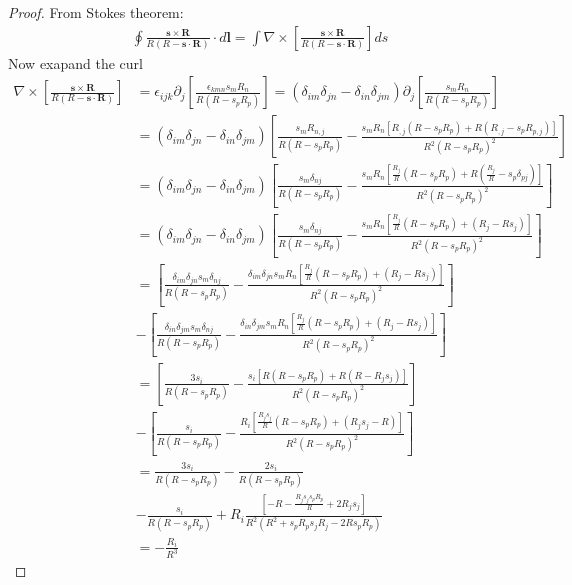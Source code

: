\begin{proof}
From Stokes theorem:
\begin{align}
\oint\frac{\bm s\times\bm R}{R(R-\bm s\cdot\bm R)}\cdot d\bm l=\int\nabla\times\left[\frac{\bm s\times\bm R}{R(R-\bm s\cdot\bm R)}\right]ds
\end{align}
Now exapand the curl
\begin{align}
\nabla\times\left[\frac{\bm s\times\bm R}{R(R-\bm s\cdot\bm R)}\right]&=\epsilon_{ijk}\partial_j\left[\frac{\epsilon_{kmn}s_mR_n}{R(R-s_pR_p)}\right]=\left(\delta_{im}\delta_{jn}-\delta_{in}\delta_{jm}\right)\partial_j\left[\frac{s_mR_n}{R(R-s_pR_p)}\right]\nonumber\\
&=\left(\delta_{im}\delta_{jn}-\delta_{in}\delta_{jm}\right)\left[\frac{s_mR_{n,j}}{R(R-s_pR_p)}-\frac{s_mR_{n}\left[R_{,j}(R-s_pR_p)+R(R_{,j}-s_pR_{p,j})\right]}{R^2(R-s_pR_p)^2}\right]\nonumber\\
&=\left(\delta_{im}\delta_{jn}-\delta_{in}\delta_{jm}\right)\left[\frac{s_m\delta_{nj}}{R(R-s_pR_p)}-\frac{s_mR_{n}\left[\frac{R_j}{R}(R-s_pR_p)+R(\frac{R_j}{R}-s_p\delta_{pj})\right]}{R^2(R-s_pR_p)^2}\right]\nonumber\\
&=\left(\delta_{im}\delta_{jn}-\delta_{in}\delta_{jm}\right)\left[\frac{s_m\delta_{nj}}{R(R-s_pR_p)}-\frac{s_mR_{n}\left[\frac{R_j}{R}(R-s_pR_p)+(R_j-Rs_j)\right]}{R^2(R-s_pR_p)^2}\right]\nonumber\\
&=\left[\frac{\delta_{im}\delta_{jn}s_m\delta_{nj}}{R(R-s_pR_p)}-\frac{\delta_{im}\delta_{jn}s_mR_{n}\left[\frac{R_j}{R}(R-s_pR_p)+(R_j-Rs_j)\right]}{R^2(R-s_pR_p)^2}\right]\nonumber\\
&-\left[\frac{\delta_{in}\delta_{jm}s_m\delta_{nj}}{R(R-s_pR_p)}-\frac{\delta_{in}\delta_{jm}s_mR_{n}\left[\frac{R_j}{R}(R-s_pR_p)+(R_j-Rs_j)\right]}{R^2(R-s_pR_p)^2}\right]\nonumber\\
&=\left[\frac{3s_i}{R(R-s_pR_p)}-\frac{s_i\left[R(R-s_pR_p)+R(R-R_{j}s_j)\right]}{R^2(R-s_pR_p)^2}\right]\nonumber\\
&-\left[\frac{s_i}{R(R-s_pR_p)}-\frac{R_{i}\left[\frac{R_js_j}{R}(R-s_pR_p)+(R_js_j-R)\right]}{R^2(R-s_pR_p)^2}\right]\nonumber\\
&=\frac{3s_i}{R(R-s_pR_p)}-\frac{2s_i}{R(R-s_pR_p)}\nonumber\\
&-\frac{s_i}{R(R-s_pR_p)}+R_{i}\frac{\left[-R-\frac{R_js_js_pR_p}{R}+2R_js_j\right]}{R^2(R^2+s_pR_ps_jR_j-2Rs_pR_p)}\nonumber\\
&=-\frac{R_i}{R^3}
\end{align}
\end{proof}

